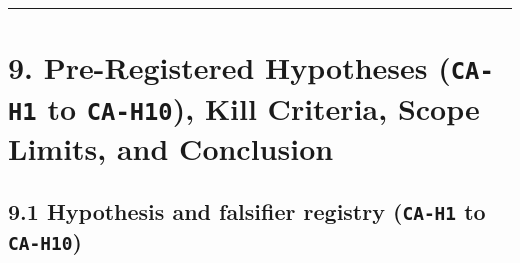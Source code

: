 \documentclass[10pt,letterpaper]{article}
\begin{document}
\begin{center}\rule{0.5\linewidth}{0.5pt}\end{center}

\section{\texorpdfstring{9. Pre-Registered Hypotheses (\texttt{CA-H1} to
\texttt{CA-H10}), Kill Criteria, Scope Limits, and
Conclusion}{9. Pre-Registered Hypotheses (CA-H1 to CA-H10), Kill Criteria, Scope Limits, and Conclusion}}\label{pre-registered-hypotheses-ca-h1-to-ca-h10-kill-criteria-scope-limits-and-conclusion}

\subsection{\texorpdfstring{9.1 Hypothesis and falsifier registry
(\texttt{CA-H1} to
\texttt{CA-H10})}{9.1 Hypothesis and falsifier registry (CA-H1 to CA-H10)}}\label{hypothesis-and-falsifier-registry-ca-h1-to-ca-h10}
\end{document}
